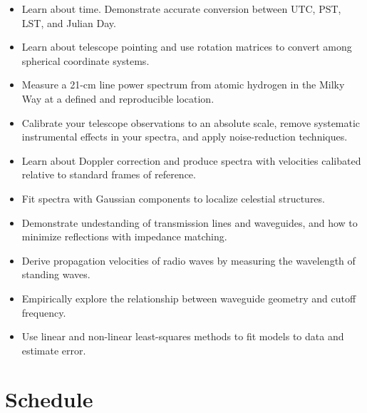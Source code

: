 \documentclass[11pt,preprint]{aastex}
\begin{document}
\begin{itemize}

\item Learn about time. Demonstrate accurate conversion between UTC, PST, LST,
and Julian Day.

\item Learn about telescope pointing and use rotation matrices to convert among spherical
  coordinate systems.

\item Measure a 21-cm line power spectrum from atomic hydrogen in the
  Milky Way at a defined and reproducible location.

\item Calibrate your telescope observations to an absolute scale, remove
systematic instrumental effects in your spectra, and apply noise-reduction
techniques.

\item Learn about Doppler correction and produce spectra with velocities 
calibated relative to standard frames of reference.

\item Fit spectra with Gaussian components to localize celestial structures.

\item Demonstrate undestanding of transmission lines and waveguides, and 
how to minimize reflections with impedance matching.

\item Derive propagation velocities of radio waves by measuring the wavelength of
  standing waves.

\item Empirically explore the relationship between waveguide geometry and cutoff frequency.

\item Use linear and non-linear least-squares methods to fit models to data and
estimate error.

\end{itemize}


\section{Schedule}
\end{document}
